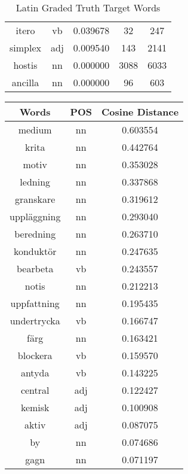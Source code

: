 \begin{table}
\begin{tabular}{ccccc}
itero            & vb            & 0.039678           & 32                 & 247                 \\
simplex          & adj           & 0.009540           & 143                & 2141                \\
hostis           & nn            & 0.000000           & 3088               & 6033                \\
ancilla          & nn            & 0.000000           & 96                 & 603                 \\
\bottomrule
\end{tabular}
\caption{Latin Graded Truth Target Words}
\label{tab:lat-truthtargets}
\end{table}


\begin{table}[h]
\centering
\begin{tabular}{ccc} 
\toprule
Words        & POS & Cosine Distance  \\ 
\midrule
medium       & nn  & 0.603554         \\
krita        & nn  & 0.442764         \\
motiv        & nn  & 0.353028         \\
ledning      & nn  & 0.337868         \\
granskare    & nn  & 0.319612         \\
uppläggning  & nn  & 0.293040         \\
beredning    & nn  & 0.263710         \\
konduktör    & nn  & 0.247635         \\
bearbeta     & vb  & 0.243557         \\
notis        & nn  & 0.212213         \\
uppfattning  & nn  & 0.195435         \\
undertrycka  & vb  & 0.166747         \\
färg         & nn  & 0.163421         \\
blockera     & vb  & 0.159570         \\
antyda       & vb  & 0.143225         \\
central      & adj & 0.122427         \\
kemisk       & adj & 0.100908         \\
aktiv        & adj & 0.087075         \\
by           & nn  & 0.074686         \\
gagn         & nn  & 0.071197         \\

\end{tabular}
\end{table}
